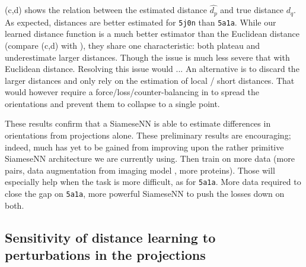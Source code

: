 (c,d) shows the relation between the estimated distance $\widehat{d_p}$ and true distance $d_q$.
As expected, distances are better estimated for \texttt{5j0n} than \texttt{5a1a}.
While our learned distance function is a much better estimator than the Euclidean distance (compare (c,d) with ), they share one characteristic: both plateau and underestimate larger distances.
Though the issue is much less severe that with Euclidean distance.
Resolving this issue would ...
An alternative is to discard the larger distances and only rely on the estimation of local / short distances.
That would however require a force/loss/counter-balancing in  to spread the orientations and prevent them to collapse to a single point.

These results confirm that a SiameseNN is able to estimate differences in orientations from projections alone.
These preliminary results are encouraging; indeed, much has yet to be gained from improving upon the rather primitive SiameseNN architecture we are currently using.
Then train on more data (more pairs, data augmentation from imaging model , more proteins).
Those will especially help when the task is more difficult, as for \texttt{5a1a}.
More data required to close the gap on \texttt{5a1a}, more powerful SiameseNN to push the losses down on both.


\subsection{Sensitivity of distance learning to perturbations in the projections}\label{sec:results:distance-estimation:sensitivity}

